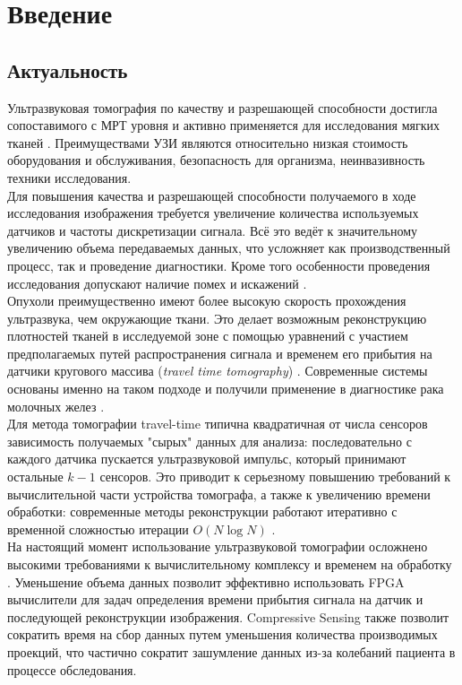 \documentclass[14pt]{matmex-diploma}
\begin{document}
\section{Введение}

\subsection{Актуальность}
Ультразвуковая томография по качеству и разрешающей способности достигла сопоставимого с МРТ уровня и активно применяется для исследования мягких тканей \cite{hopp2014breast}. 
Преимуществами УЗИ являются относительно низкая стоимость оборудования и обслуживания, безопасность для организма, неинвазивность техники исследования. \\
Для повышения качества и разрешающей способности получаемого в ходе исследования изображения требуется увеличение количества используемых датчиков и частоты дискретизации сигнала. Всё это ведёт к значительному увеличению объема передаваемых данных, что усложняет как производственный процесс, так и проведение диагностики. Кроме того особенности проведения исследования допускают наличие помех и искажений \cite{shannon_th}. \\
Опухоли преимущественно имеют более высокую скорость прохождения ультразвука, чем окружающие ткани. Это делает возможным реконструкцию плотностей тканей в исследуемой зоне с помощью уравнений с участием предполагаемых путей распространения сигнала и временем его прибытия на датчики кругового массива (\textit{travel time tomography}) \cite{quan2007sound}. Современные системы основаны именно на таком подходе и получили применение в диагностике рака молочных желез \cite{hormati2010robust}\cite{schreiman1984ultrasound}. \\
Для метода томографии travel-time типична квадратичная от числа сенсоров зависимость получаемых "сырых" данных для анализа: последовательно с каждого датчика пускается ультразвуковой импульс, который принимают остальные $k-1$ сенсоров. Это приводит к серьезному повышению требований к вычислительной части устройства томографа, а также к увеличению времени обработки: современные методы реконструкции работают итеративно с временной сложностью итерации $O(N\log N)$ \cite{chen2012compressive}. \\
На настоящий момент использование ультразвуковой томографии осложнено высокими требованиями к вычислительному комплексу и временем на обработку \cite{ozmen2014ultrasound}. Уменьшение объема данных позволит эффективно использовать FPGA вычислители для задач определения времени прибытия сигнала на датчик и последующей реконструкции изображения. Compressive Sensing также позволит сократить время на сбор данных путем уменьшения количества производимых проекций, что частично сократит зашумление данных из-за колебаний пациента в процессе обследования.
\end{document}
